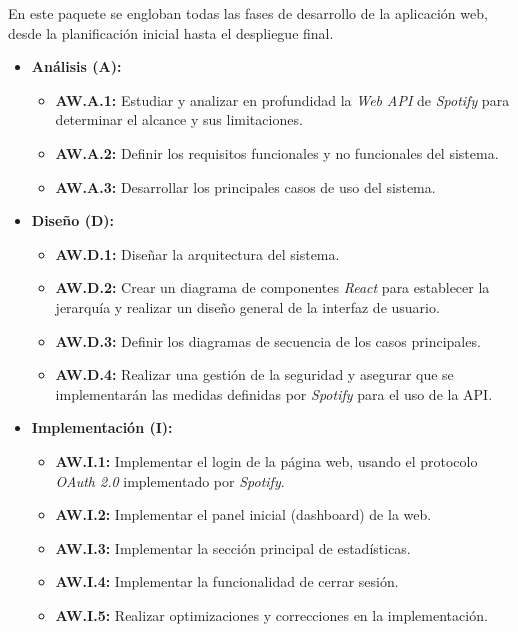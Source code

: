 En este paquete se engloban todas las fases de desarrollo de la aplicación web, desde la planificación inicial hasta el despliegue final.

\begin{itemize}
    \item \textbf{Análisis (A):}
          \begin{itemize}
              \item \textbf{AW.A.1:} Estudiar y analizar en profundidad la \textit{Web API} de \textit{Spotify} para determinar el alcance y sus limitaciones.
              \item \textbf{AW.A.2:} Definir los requisitos funcionales y no funcionales del sistema.
              \item \textbf{AW.A.3:} Desarrollar los principales casos de uso del sistema.
          \end{itemize}

          \vspace{2em}

    \item \textbf{Diseño (D):}
          \begin{itemize}
              \item \textbf{AW.D.1:} Diseñar la arquitectura del sistema.
              \item \textbf{AW.D.2:} Crear un diagrama de componentes \textit{React} para establecer la jerarquía y realizar un diseño general de la interfaz de usuario.
              \item \textbf{AW.D.3:} Definir los diagramas de secuencia de los casos principales.
              \item \textbf{AW.D.4:} Realizar una gestión de la seguridad y asegurar que se implementarán las medidas definidas por \textit{Spotify} para el uso de la API.
          \end{itemize}

    \item \textbf{Implementación (I):}
          \begin{itemize}
              \item \textbf{AW.I.1:} Implementar el login de la página web, usando el protocolo \textit{OAuth 2.0} implementado por \textit{Spotify}.
              \item \textbf{AW.I.2:} Implementar el panel inicial (dashboard) de la web.
              \item \textbf{AW.I.3:} Implementar la sección principal de estadísticas.
              \item \textbf{AW.I.4:} Implementar la funcionalidad de cerrar sesión.
              \item \textbf{AW.I.5:} Realizar optimizaciones y correcciones en la implementación.
          \end{itemize}


\end{itemize}
